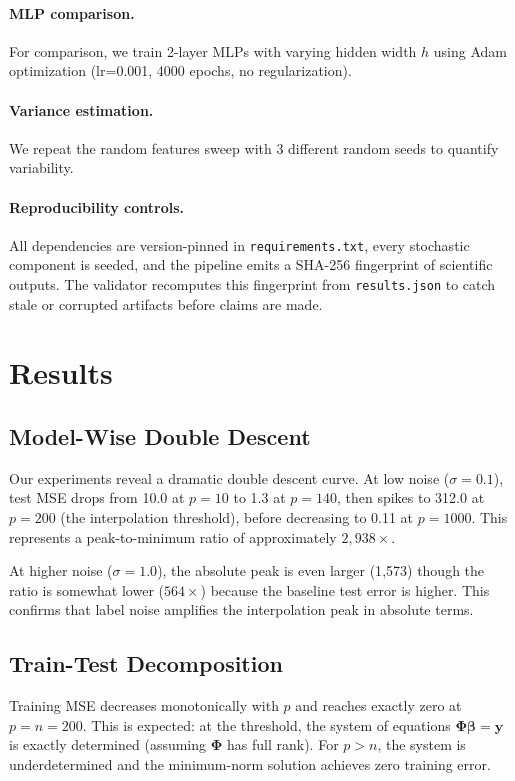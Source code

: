 \documentclass[11pt]{article}
\begin{document}
\paragraph{MLP comparison.} For comparison, we train 2-layer MLPs with varying hidden width $h$ using Adam optimization (lr=0.001, 4000 epochs, no regularization).

\paragraph{Variance estimation.} We repeat the random features sweep with 3 different random seeds to quantify variability.

\paragraph{Reproducibility controls.} All dependencies are version-pinned in \texttt{requirements.txt}, every stochastic component is seeded, and the pipeline emits a SHA-256 fingerprint of scientific outputs. The validator recomputes this fingerprint from \texttt{results.json} to catch stale or corrupted artifacts before claims are made.

\section{Results}

\subsection{Model-Wise Double Descent}

Our experiments reveal a dramatic double descent curve. At low noise ($\sigma = 0.1$), test MSE drops from 10.0 at $p = 10$ to 1.3 at $p = 140$, then spikes to 312.0 at $p = 200$ (the interpolation threshold), before decreasing to 0.11 at $p = 1000$. This represents a peak-to-minimum ratio of approximately $2{,}938 \times$.

At higher noise ($\sigma = 1.0$), the absolute peak is even larger (1{,}573) though the ratio is somewhat lower ($564\times$) because the baseline test error is higher. This confirms that label noise amplifies the interpolation peak in absolute terms.

\subsection{Train-Test Decomposition}

Training MSE decreases monotonically with $p$ and reaches exactly zero at $p = n = 200$. This is expected: at the threshold, the system of equations $\boldsymbol{\Phi}\boldsymbol{\beta} = \mathbf{y}$ is exactly determined (assuming $\boldsymbol{\Phi}$ has full rank). For $p > n$, the system is underdetermined and the minimum-norm solution achieves zero training error.
\end{document}
